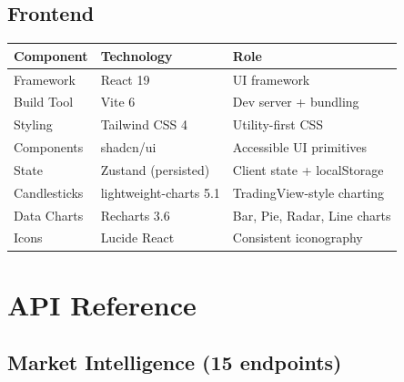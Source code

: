 \documentclass[11pt, a4paper]{article}
\begin{document}
\subsection{Frontend}

\begin{center}
\small
\begin{tabular}{L{3cm} L{3.6cm} L{6.6cm}}
  \toprule
  \textbf{Component} & \textbf{Technology} & \textbf{Role} \\
  \midrule
  Framework     & React 19                & UI framework \\
  Build Tool    & Vite 6                  & Dev server + bundling \\
  Styling       & Tailwind CSS 4          & Utility-first CSS \\
  Components    & shadcn/ui               & Accessible UI primitives \\
  State         & Zustand (persisted)     & Client state + localStorage \\
  Candlesticks  & lightweight-charts 5.1  & TradingView-style charting \\
  Data Charts   & Recharts 3.6            & Bar, Pie, Radar, Line charts \\
  Icons         & Lucide React            & Consistent iconography \\
  \bottomrule
\end{tabular}
\end{center}

\section{API Reference}

\subsection{Market Intelligence (15 endpoints)}
\end{document}
